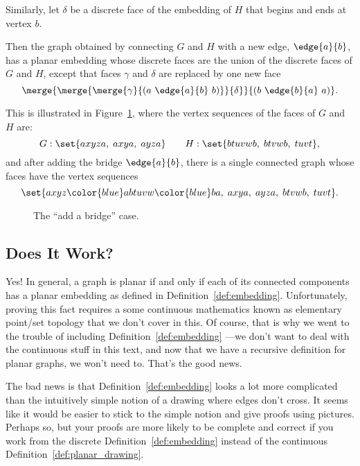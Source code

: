 \begin{definition}
Similarly, let $\delta$ be a discrete face of the embedding of $H$
that begins and ends at vertex $b$.
\iffalse
So $\delta$ is of the form
\[
b\cdots b.
\]
\fi

Then the graph obtained by connecting $G$ and $H$ with a new edge,
$\edge{a}{b}$, has a planar embedding whose discrete faces are the union of
the discrete faces of $G$ and $H$, except that faces $\gamma$ and $\delta$
are replaced by one new face
\[
\merge{\merge{\merge{\gamma}{(a\ \edge{a}{b}\ b)}}{\delta}}{(b\ \edge{b}{a}\ a)}.
\]

This is illustrated in Figure~\ref{fig:add-bridge}, where the vertex
sequences of the faces of $G$ and $H$ are:
\[
G: \set{ axyza,\; axya,\; ayza }
    \qquad H: \set{ btuvwb,\; btvwb,\; tuvt },
\]
and after adding the bridge $\edge{a}{b}$, there is a
single connected graph whose faces have the vertex sequences
\[
\set{ axyz{\color{blue}ab}tuvw{\color{blue}ba},\;
         axya,\; ayza,\; btvwb,\; tuvt }.
\]

\begin{figure}


\caption{The ``add a bridge'' case.}
\label{fig:add-bridge}
\end{figure}

\end{definition}

\subsection{Does It Work?}

Yes!  In general, a graph is planar if and only if each of its
connected components has a planar embedding as defined in
Definition~\ref{def:embedding}.  Unfortunately, proving this fact
requires a some continuous mathematics known as elementary point/set
topology that we don't cover in this.  Of course, that is why we went
to the trouble of including Definition~\ref{def:embedding} ---we don't
want to deal with the continuous stuff in this text, and now that we
have a recursive definition for planar graphs, we won't need to.
That's the good news.

The bad news is that Definition~\ref{def:embedding} looks a lot more
complicated than the intuitively simple notion of a drawing where
edges don't cross.  It seems like it would be easier to stick to the
simple notion and give proofs using pictures.  Perhaps so, but your
proofs are more likely to be complete and correct if you work from the
discrete Definition~\ref{def:embedding} instead of the continuous
Definition~\ref{def:planar_drawing}.

